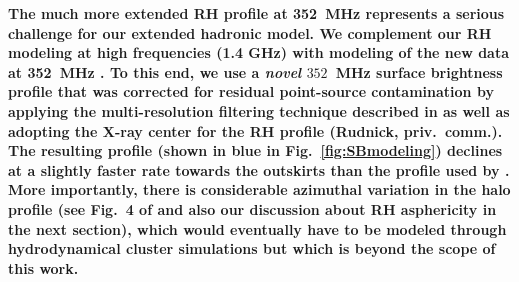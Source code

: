 \documentclass[useAMS,usenatbib]{mn2e}
\begin{document}
 

{\bf The much more extended RH profile at 352~MHz represents a serious
challenge for our extended hadronic model. We complement our RH modeling at high
frequencies (1.4 GHz) with modeling of the new data at 352~MHz
\citep{2011MNRAS.412....2B}. To this end, we use a {\em novel} $352$~MHz surface
brightness profile that was corrected for residual point-source contamination by
applying the multi-resolution filtering technique described in
\citet{2002PASP..114..427R} as well as adopting the X-ray center for the RH
profile (Rudnick, priv.{\ }comm.). The resulting profile (shown in blue in
Fig.~\ref{fig:SBmodeling}) declines at a slightly faster rate towards the outskirts
than the profile used by \citet{2012arXiv1207.3025B}. More
importantly, there is considerable azimuthal variation in the halo profile 
(see Fig.{\ }4 of \citealp{2011MNRAS.412....2B} and also our discussion about 
RH asphericity in the next section), which would eventually have to
be modeled through hydrodynamical cluster simulations but which is beyond the
scope of this work.}  
%
\end{document}
